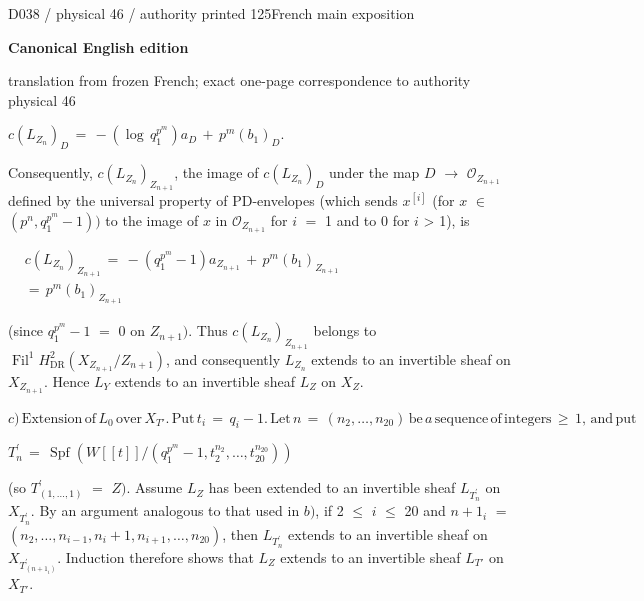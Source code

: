 \documentclass[9pt]{article}
\newcommand{\CanonText}[1]{\par{\fontsize{8.0}{9.35}\selectfont\RaggedRight #1\par}\vspace{2.2pt}}
\newcommand{\CanonDisplay}[1]{\par\vspace{1.2pt}\begin{center}{\fontsize{7.2}{8.4}\selectfont\(\displaystyle #1\)}\end{center}\vspace{1.2pt}}
\newenvironment{CanonMathBlock}{\par\vspace{1.2pt}\begin{center}\fontsize{6.8}{8.0}\selectfont\(\displaystyle}{\)\end{center}\vspace{1.2pt}}
\newcommand{\LayerTitle}{Canonical English edition}
\begin{document}
\noindent\begin{minipage}[t][\dimexpr\textheight-5pt\relax][t]{\textwidth}
{\sffamily\fontsize{7.3}{8.2}\selectfont\color{Quiet} D038 / physical 46 / authority printed 125\hfill French main exposition}
\par{}\vspace{4.5pt}
{\sffamily\fontsize{10.4}{11.6}\selectfont\bfseries\color{Accent} \LayerTitle}
\par{\sffamily\fontsize{6.7}{7.7}\selectfont\color{Quiet} translation from frozen French; exact one-page correspondence to authority physical 46}
\vspace{5pt}
\CanonDisplay{c(L_{Z_{n}})_{D}\,=\,-(\operatorname{log}\,q_{1}^{p^{m}})a_{D}\,+\,p^{m}(b_{1})_{D}.}
\CanonText{Consequently, \(c(L_{Z_{n}})_{Z_{n+1}}\), the image of \(c(L_{Z_{n}})_{D}\) under the map \(D\) \(\to{}\) \(\mathcal{O}_{Z_{n+1}}\) defined by the universal property of PD-envelopes (which sends \(x^{[i]}\) (for \(x\) \(\in{}\) \((p^{n},q_{1}^{p^{m}}-1))\) to the image of \(x\) in \(\mathcal{O}_{Z_{n+1}}\) for \(i\) \(=\) 1 and to 0 for \(i\) > 1), is}
\begin{CanonMathBlock}
\begin{aligned}
& c(L_{Z_{n}})_{Z_{n+1}}\,=\,-(q_{1}^{p^{m}}-1)a_{Z_{n+1}}\,+\,p^{m}(b_{1})_{Z_{n+1}}\\
& =\,p^{m}(b_{1})_{Z_{n+1}}
\end{aligned}
\end{CanonMathBlock}
\CanonText{(since \(q_{1}^{p^{m}}-1\) \(=\) 0 on \(Z_{n+1})\). Thus \(c(L_{Z_{n}})_{Z_{n+1}}\) belongs to \(\operatorname{Fil}^{1}H^{2}_{\mathrm{DR}}(X_{Z_{n+1}}/Z_{n+1})\), and consequently \(L_{Z_{n}}\) extends to an invertible sheaf on \(X_{Z_{n+1}}\). Hence \(L_{Y}\) extends to an invertible sheaf \(L_{Z}\) on \(X_{Z}\).}
\CanonDisplay{c)\,\text{Extension}\,\text{of}\,L_{0}\,\text{over}\,X_{T'}.\,\text{Put}\,t_{i}\,=\,q_{i}-1.\,\text{Let}\,n\,=\,(n_{2},\ldots{},n_{20})\,\text{be}\,a\,\text{sequence}\,\text{of}\,\text{integers}\,\geq{}\,1,\,\text{and}\,\text{put}}
\CanonDisplay{T^{\prime}_{n}\,=\,\operatorname{Spf}(W[[t]]/(q_{1}^{p^{m}}-1,t_{2}^{n_{2}},\ldots{},t_{20}^{n_{20}}))}
\CanonText{(so \(T^{\prime}_{(1,\ldots{},1)}\) \(=\) \(Z)\). Assume \(L_{Z}\) has been extended to an invertible sheaf \(L_{T^{\prime}_{n}}\) on \(X_{T^{\prime}_{n}}\). By an argument analogous to that used in \(b)\), if 2 \(\leq{}\) \(i\) \(\leq{}\) 20 and \(n+1_{i}\) \(=\) \((n_{2},\ldots{},n_{i-1},n_{i}+1,n_{i+1},\ldots{},n_{20})\), then \(L_{T^{\prime}_{n}}\) extends to an invertible sheaf on \(X_{T^{\prime}_{(n+1_{i})}}\). Induction therefore shows that \(L_{Z}\) extends to an invertible sheaf \(L_{T'}\) on \(X_{T'}\).}

\end{minipage}
\end{document}
